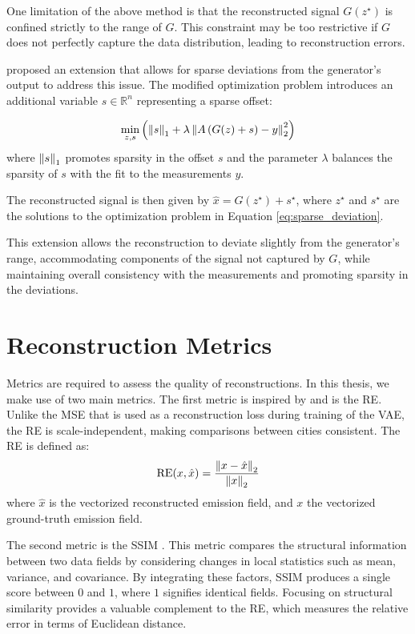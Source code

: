 One limitation of the above method is that the reconstructed signal $G(z^{\star})$ is confined strictly to the range of $G$.
This constraint may be too restrictive if $G$ does not perfectly capture the data distribution, leading to reconstruction errors.

\textcite{SparseCSUsingAI} proposed an extension that allows for sparse deviations from the generator's output to address this issue.
The modified optimization problem introduces an additional variable $s \in \mathbb{R}^n$ representing a sparse offset:

\begin{equation}
    \min_{z, s}{\left(\left\lVert s\right\rVert_1 + \lambda \left\lVert A \left( G(z) + s \right) - y\right\rVert_2^2 \right)}
    \label{eq:sparse_deviation}
\end{equation}
where $\left\lVert s\right\rVert_1$ promotes sparsity in the offset $s$ and the parameter $\lambda$ balances the sparsity of $s$ with the fit to the measurements $y$.

The reconstructed signal is then given by $\hat{x} = G(z^\star) + s^\star$, where $z^\star$ and $s^\star$ are the solutions to the optimization problem in Equation \ref{eq:sparse_deviation}.

This extension allows the reconstruction to deviate slightly from the generator's range, accommodating components of the signal not captured by $G$, while maintaining overall consistency with the measurements and promoting sparsity in the deviations.

\section{Reconstruction Metrics}
Metrics are required to assess the quality of reconstructions.
In this thesis, we make use of two main metrics.
The first metric is inspired by \textcite{UrbanSparseReconstruction} and is the \gls{RE}.
Unlike the \gls{MSE} that is used as a reconstruction loss during training of the \gls{VAE}, the \gls{RE} is scale-independent, making comparisons between cities consistent.
The \gls{RE} is defined as: 
\begin{equation}
    \text{RE}(x, \hat{x}) = \frac{\left\lVert x - \hat{x}\right\rVert_2}{\left\lVert x\right\rVert_2}
\end{equation}
where $\hat{x}$ is the vectorized reconstructed emission field, and $x$ the vectorized ground-truth emission field.

The second metric is the \gls{SSIM} \parencite{SSIM}.
This metric compares the structural information between two data fields by considering changes in local statistics such as mean, variance, and covariance.
By integrating these factors, \gls{SSIM} produces a single score between $0$ and $1$, where $1$ signifies identical fields.
Focusing on structural similarity provides a valuable complement to the \gls{RE}, which measures the relative error in terms of Euclidean distance.

